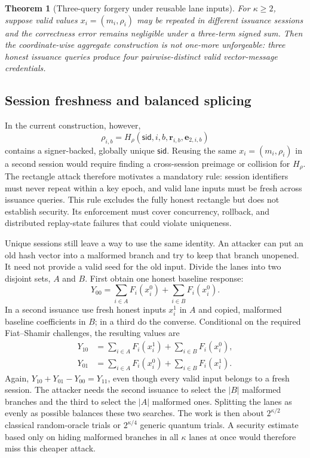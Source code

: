 \documentclass[10pt]{article}
\newtheorem{theorem}{Theorem}
\begin{document}
\begin{theorem}[Three-query forgery under reusable lane inputs]
For $\kappa\geq2$, suppose valid values $x_i=(m_i,\rho_i)$ may be repeated in
different issuance sessions and the correctness error remains negligible under
a three-term signed sum.  Then the coordinate-wise aggregate construction is
not one-more unforgeable: three honest issuance queries produce four
pairwise-distinct valid vector-message credentials.
\end{theorem}

\subsection{Session freshness and balanced splicing}

In the current construction, however,
\[
 \rho_{i,b}=H_\rho(\mathsf{sid},i,b,\mathbf r_{i,b},\mathbf e_{2,i,b})
\]
contains a signer-backed, globally unique $\mathsf{sid}$.  Reusing the same
$x_i=(m_i,\rho_i)$ in a second session would require finding a cross-session
preimage or collision for $H_\rho$.  The rectangle attack therefore motivates
a mandatory rule: session identifiers must never repeat within a key epoch,
and valid lane inputs must be fresh across issuance queries.  This rule
excludes the fully honest rectangle but does not establish security.  Its
enforcement must cover concurrency, rollback, and distributed replay-state
failures that could violate uniqueness.

Unique sessions still leave a way to use the same identity.  An attacker
can put an old hash vector into a malformed branch and try to keep that
branch unopened.  It need not provide a valid seed for the old input.
Divide the lanes into two disjoint sets, $A$ and $B$.  First obtain one
honest baseline response:
\[
 Y_{00}=\sum_{i\in A}F_i(x_i^0)+\sum_{i\in B}F_i(x_i^0).
\]
In a second issuance use fresh honest inputs $x_i^1$ in $A$ and copied,
malformed baseline coefficients in $B$; in a third do the converse.  Conditional
on the required Fiat--Shamir challenges, the resulting values are
\begin{align*}
 Y_{10}&=\sum_{i\in A}F_i(x_i^1)+\sum_{i\in B}F_i(x_i^0),\\
 Y_{01}&=\sum_{i\in A}F_i(x_i^0)+\sum_{i\in B}F_i(x_i^1).
\end{align*}
Again, $Y_{10}+Y_{01}-Y_{00}=Y_{11}$, even though every valid input belongs
to a fresh session.  The attacker needs the second issuance to select the
$|B|$ malformed branches and the third to select the $|A|$ malformed ones.
Splitting the lanes as evenly as possible balances these two searches.
The work is then about $2^{\kappa/2}$ classical random-oracle trials or
$2^{\kappa/4}$ generic quantum trials.  A security estimate based only on
hiding malformed branches in all $\kappa$ lanes at once would therefore
miss this cheaper attack.
\end{document}

